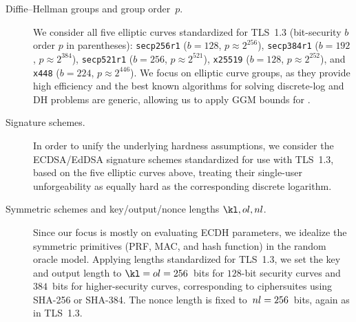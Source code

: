 \begin{description}
	\item[Diffie--Hellman groups and group order~$p$.]
	We consider all five elliptic curves standardized for TLS~1.3 (bit-security $b$ order $p$ in parentheses):
	\texttt{secp256r1} ($b = 128$, $p \approx 2^{256}$), %
	\texttt{secp384r1} ($b = 192$, $p \approx 2^{384}$), %
	\texttt{secp521r1} ($b = 256$, $p \approx 2^{521}$), %
	\texttt{x25519} ($b = 128$, $p \approx 2^{252}$), and %
	\texttt{x448} ($b = 224$, $p \approx 2^{446}$). %
	We focus on elliptic curve groups, as they provide high efficiency and the best known algorithms for solving discrete-log and DH problems are generic,
	allowing us to apply GGM bounds for .

	
	\item[Signature schemes.]
	In order to unify the underlying hardness assumptions, we consider the ECDSA/EdDSA signature schemes standardized for use with TLS~1.3, based on the five elliptic curves above,
	treating their single-user unforgeability as equally hard as the corresponding discrete logarithm.
	
	\item[Symmetric schemes and key/output/nonce lengths $\kl, \ol, \nl$.]%
	Since our focus is mostly on evaluating ECDH parameters,
	we idealize the symmetric primitives (PRF, MAC, and hash function) in the random oracle model.
	Applying lengths standardized for TLS~1.3, we set the key and output length to $\kl = \ol = 256$~bits for $128$-bit security curves and $384$~bits for higher-security curves, corresponding to ciphersuites using SHA-256 or SHA-384.
	The nonce length is fixed to~$nl = 256$~bits, again as in TLS~1.3.
	

\end{description}
